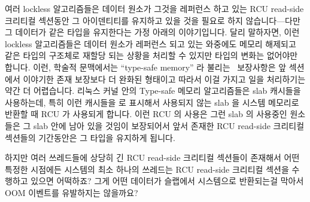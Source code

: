 여러 lockless 알고리즘들은 데이터 원소가 그것을 레퍼런스 하고 있는
RCU read-side 크리티컬 섹션동안 그 아이덴티티를 유지하고 있을 것을 필요로 하지
않습니다---다만 그 데이터가 같은 타입을 유지한다는 가정 아래의
이야기입니다.
달리 말하자면, 이런 lockless 알고리즘들은 데이터 원소가 레퍼런스 되고 있는
와중에도 메모리 해제되고 같은 타입의 구조체로 재할당 되는 상황을 처리할 수
있지만 타입의 변화는 없어야만 합니다.
이런, 학술적 문맥에서는 ``type-safe memory'' 라 불리는~\cite{Cheriton96a}
보장사항은 앞 섹션에서 이야기한 존재 보장보다 더 완화된 형태이고 따라서 이걸
가지고  일을 처리하기는 약간 더 어렵습니다.
리눅스 커널 안의 Type-safe 메모리 알고리즘들은 slab 캐시들을 사용하는데, 특히
이런 캐시들을  로 표시해서 사용되지 않는 slab 을 시스템
메모리로 반환할 때 RCU 가 사용되게 합니다.
이런 RCU 의 사용은 그런 slab 의 사용중인 원소들은 그 slab 안에 남아 있을 것임이
보장되어서 앞서 존재한 RCU read-side 크리티컬 섹션들의 기간동안은 그 타입을
유지하게 됩니다.

\QuickQuiz{}
	하지만 여러 쓰레드들에 상당히 긴 RCU read-side 크리티컬 섹션들이
	존재해서 어떤 특정한 시점에든 시스템의 최소 하나의 쓰레드는 RCU
	read-side 크리티컬 섹션을 수행하고 있으면 어떡하죠?
	그게 어떤 데이터가  슬랩에서 시스템으로
	반환되는걸 막아서 OOM 이벤트를 유발하지는 않을까요?
	\iffalse

